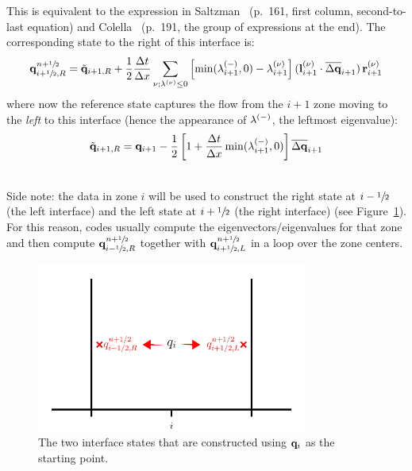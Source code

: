 This is equivalent to the expression in Saltzman~\cite{saltzman:1994}
(p.\ 161, first column, second-to-last equation) and
Colella~\cite{colella:1990} (p.\ 191, the group of expressions at the
end).  The corresponding state to the right of this interface is:
\begin{equation}
{\bf q}_{i+{\sfrac{1}{2}},R}^{n+{\sfrac{1}{2}}} = \tilde{{\bf q}}_{i+1,R} + \frac{1}{2} \frac{\Delta t}{\Delta x}
       \sum_{\nu; \lambda^{(\nu)} \le 0}
       \left [ \min(\lambda_{i+1}^{(-)},0) - \lambda_{i+1}^{(\nu)} \right ]
       ({\bf l}_{i+1}^{(\nu)} \cdot \overline{\Delta {\bf q}}_{i+1}) \, {\bf r}_{i+1}^{(\nu)}
\end{equation}
where now the reference state captures the flow from the $i+1$ zone
moving to the {\em left} to this interface (hence the appearance of
$\lambda^{(-)}$, the leftmost eigenvalue):
\begin{equation}
\tilde{{\bf q}}_{i+1,R} = {\bf q}_{i+1} - \frac{1}{2} \left [ 1 + \frac{\Delta t}{\Delta x} \min(\lambda_{i+1}^{(-)},0) \right ] \overline{\Delta {\bf q}}_{i+1}
\end{equation}

\ \\

Side note: the data in zone $i$ will be used to construct the right
state at $i-{\sfrac{1}{2}}$ (the left interface) and the left state at $i+{\sfrac{1}{2}}$
(the right interface) (see Figure~\ref{fig:states}).  For this reason,
codes usually compute the eigenvectors/eigenvalues for that zone and
then compute ${\bf q}_{i-{\sfrac{1}{2}},R}^{n+{\sfrac{1}{2}}}$ together with ${\bf q}_{i+{\sfrac{1}{2}},L}^{n+{\sfrac{1}{2}}}$
in a loop over the zone centers.

\begin{figure}
\centering
\includegraphics[width=3.5in]{states}
\caption[The two interface states derived from a cell-center quantity]{\label{fig:states} The two interface states that are constructed
using ${\bf q}_i$ as the starting point.}
\end{figure}

